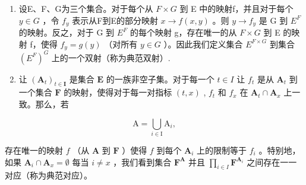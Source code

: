 \begin{enumerate}
\def\labelenumi{\arabic{enumi}.}
\setcounter{enumi}{13}
\item
  设E、F、G为三个集合。对于每个从 \(F \times G\) 到 E 中的映射f，并且对于每个 \(y \in G\) ，令 \(f_{y}\) 表示从F到E的部分映射 \(x \to f(x, y)\) 。则 \(y \to f_{y}\) 是 G 到 \(E^{F}\) 的映射。反之，对于 G 到 \(E^{F}\) 的每个映射 g，存在唯一的从 \(F \times G\) 到 E 的映射 f，使得 \(f_{y} = g(y)\) （对所有 \(y \in G\) ）。因此我们定义集合 \(E^{F \times G}\) 到集合 \((E^{F})^{G}\) 上的一个双射（称为典范双射）.
\item
  让 \((\mathbf{A}_t)_{t \in \mathbf{I}}\) 是集合 \(\mathbf{E}\) 的一族非空子集。对于每一个 \(t \in I\) 让 \(f_t\) 是从 \(\mathbf{A}_t\) 到一个集合 \(\mathbf{F}\) 的映射，使得对于每一对指标 \((t, x)\) , \(f_t\) 和 \(f_x\) 在 \(\mathbf{A}_t \cap \mathbf{A}_x\) 上一致。那么，若
\end{enumerate}

\[
\mathrm{A} = \bigcup_ {i \in \mathrm{I}} \mathrm{A} _ {i},
\]

存在唯一的映射 \(f\) （从 \(\mathbf{A}\) 到 \(\mathbf{F}\) ）使得 \(f\) 到每个 \(\mathbf{A}_i\) 上的限制等于 \(f_i\) 。特别地，如果 \(\mathbf{A}_i \cap \mathbf{A}_x = \emptyset\) 每当 \(i \neq x\) ，我们看到集合 \(\mathbf{F}^{\mathbf{A}}\) 并且 \(\prod_{i \in I} \mathbf{F}^{\mathbf{A}_i}\) 之间存在一一对应（称为典范对应）。

